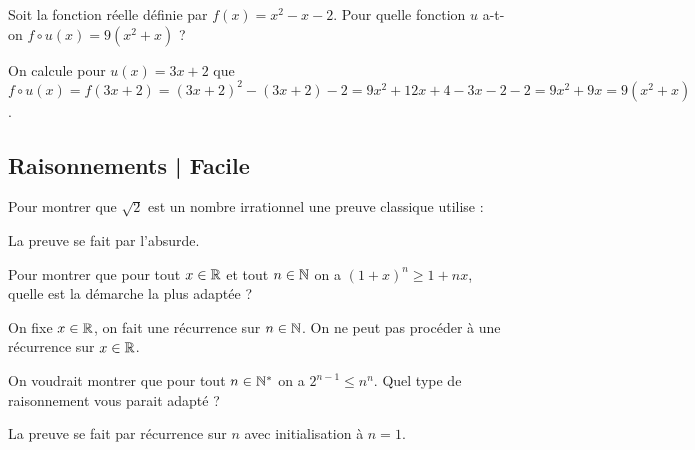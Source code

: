 \begin{question}
Soit la fonction réelle définie par $f(x) = x^2 - x - 2$. Pour quelle fonction $u$ a-t-on $f \circ u (x) = 9(x^2+x)$ ?
\begin{answers} 
\end{answers}
\begin{explanations} 
On calcule pour $u(x) = 3x+2$ que $f \circ u (x) = f(3x+2) = (3x+2)^2 - (3x+2)-2 = 9x^2 + 12x + 4 - 3x - 2 - 2 = 9x^2 + 9x = 9(x^2+x)$.
\end{explanations}
\end{question}

\subsection{Raisonnements | Facile}

\begin{question}
Pour montrer que $\sqrt2$ est un nombre irrationnel une preuve classique utilise :
\begin{answers} 
\end{answers}
\begin{explanations} 
La preuve se fait par l'absurde.
\end{explanations}
\end{question}


\begin{question}
Pour montrer que pour tout $x\in\mathbb{R}$ et tout $n\in\mathbb{N}$ on a $(1+x)^n \ge 1+nx$, quelle est la démarche la plus adaptée ?
\begin{answers} 
\end{answers}
\begin{explanations} 
On fixe $x \in \mathbb{R}$, on fait une récurrence sur $n \in \mathbb{N}$. On ne peut pas procéder à une récurrence sur $x \in \mathbb{R}$.
\end{explanations}
\end{question}


\begin{question}
On voudrait montrer que pour tout $n\in\mathbb{N}^*$ on a $2^{n-1} \le n^n$. Quel type de raisonnement vous parait adapté ?
\begin{answers} 
\end{answers}
\begin{explanations} 
La preuve se fait par récurrence sur $n$ avec initialisation à $n=1$.
\end{explanations}
\end{question}


